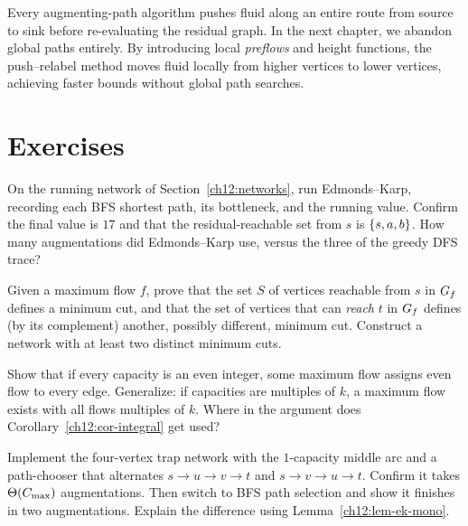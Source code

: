 Every augmenting-path algorithm pushes fluid along an entire route from source to sink before
re-evaluating the residual graph. In the next chapter, we abandon global paths entirely.
By introducing local \emph{preflows} and height functions, the push--relabel method moves fluid
locally from higher vertices to lower vertices, achieving faster bounds without global path searches.

\section{Exercises}
\label{ch12:exercises}

\begin{exercise}
On the running network of Section~\ref{ch12:networks}, run Edmonds--Karp,
recording each BFS shortest path, its bottleneck, and the running value. Confirm
the final value is $17$ and that the residual-reachable set from $s$ is
$\{s,a,b\}$. How many augmentations did Edmonds--Karp use, versus the three of
the greedy DFS trace?
\end{exercise}

\begin{exercise}
Given a maximum flow $f$, prove that the set $S$ of vertices reachable from $s$ in
$G_f$ defines a minimum cut, and that the set of vertices that can \emph{reach}
$t$ in $G_f$ defines (by its complement) another, possibly different, minimum
cut. Construct a network with at least two distinct minimum cuts.
\end{exercise}

\begin{exercise}
Show that if every capacity is an even integer, some maximum flow assigns even flow
to every edge. Generalize: if capacities are multiples of $k$, a maximum flow
exists with all flows multiples of $k$. Where in the argument does
Corollary~\ref{ch12:cor-integral} get used?
\end{exercise}

\begin{exercise}
Implement the four-vertex trap network with the $1$-capacity middle arc and a
path-chooser that alternates $s\to u\to v\to t$ and $s\to v\to u\to t$. Confirm it
takes $\Theta(C_{\max})$ augmentations. Then switch to BFS path selection and show it
finishes in two augmentations. Explain the difference using
Lemma~\ref{ch12:lem-ek-mono}.
\end{exercise}

